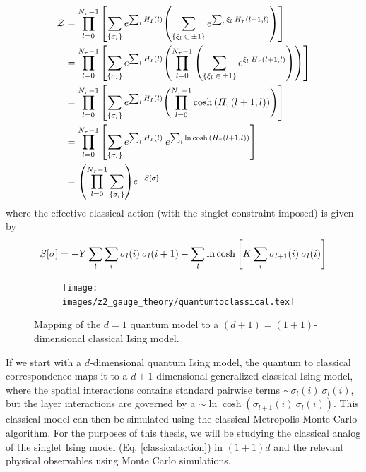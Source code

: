 \documentclass[../thesis_main.tex]{subfiles}
\begin{document}
\begin{align}
    \mathcal{Z} & = \prod_{l=0}^{N_\tau-1} \qty[\sum_{\{\sigma_l\}} e^{\sum_l H_I(l)} \qty( \sum_{\{\xi_l \: \in \: \pm 1\} } e^{\sum_l \xi_l \: H_\tau(l+1, l)})] \nonumber \\
    & = \prod_{l=0}^{N_\tau-1} \qty[\sum_{\{\sigma_l\}} e^{\sum_l H_I(l)} \qty( \prod_{l=0}^{N_\tau - 1} \qty(\sum_{\{\xi_l \: \in \: \pm 1\} } e^{\xi_l \: H_\tau(l+1, l)}))]   \nonumber \\
    & = \prod_{l=0}^{N_\tau-1} \qty[\sum_{\{\sigma_l\}} e^{\sum_l H_I(l)} \qty( \prod_{l=0}^{N_\tau - 1} \cosh \qty(H_\tau(l+1, l)))]   \nonumber \\
    & = \prod_{l=0}^{N_\tau-1} \qty[\sum_{\{\sigma_l\}} e^{\sum_l H_I(l)} \: e^{\sum_l \ln \cosh \qty(H_\tau(l+1, l))}]   \nonumber \\
    & = \qty(\prod_{l=0}^{N_\tau-1} \sum_{\{\sigma_l\}}) e^{-S[\sigma]}
\end{align}
\endgroup
where the effective classical action (with the singlet constraint imposed) is given by
\begin{equation}
    S[\sigma] = -Y\sum_l \sum_i \sigma_l(i) \: \sigma_l(i+1) - \sum_l \ln \cosh \qty[K \sum_i \sigma_{l+1}(i) \: \sigma_{l}(i)]
    \label{classicalaction}
\end{equation} 
\begin{figure}[t!]
    \centering
    \begin{subfigure}[b]{0.8\textwidth}  %
        \centering
        \texttt{[image: images/z2\_gauge\_theory/quantumtoclassical.tex]}
    \end{subfigure}
    \caption{Mapping of the $d=1$ quantum model to a $(d+1) = (1+1)$-dimensional classical Ising model.}
    \label{}
\end{figure}
If we start with a $d$-dimensional quantum Ising model, the quantum to classical correspondence maps it to a $d+1$-dimensional generalized classical Ising model, where the spatial interactions contains standard pairwise terms $\sim \sigma_l(i) \: \sigma_l(i)$, but the layer interactions are governed by a $\sim \ln \cosh (\sigma_{l+1}(i) \: \sigma_{l}(i))$. This classical model can then be simulated using the classical Metropolis Monte Carlo algorithm. For the purposes of this thesis, we will be studying the classical analog of the singlet Ising model (Eq. \eqref{classicalaction}) in $(1 + 1)d$ and the relevant physical observables using Monte Carlo simulations.
\end{document}
